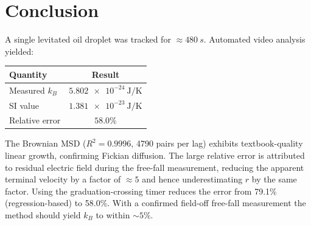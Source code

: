 \documentclass[12pt,a4paper]{article}
\begin{document}
\section{Conclusion}

A single levitated oil droplet was tracked for $\approx\SI{480}{s}$.
Automated video analysis yielded:

\begin{center}
\begin{tabular}{lc}
\toprule
Quantity & Result \\
\midrule
Measured $k_B$ & $\SI{5.802e-24}{\joule/\kelvin}$ \\
SI value       & $\SI{1.381e-23}{\joule/\kelvin}$ \\
Relative error & $58.0\%$ \\
\bottomrule
\end{tabular}
\end{center}

The Brownian MSD ($R^2=0.9996$, 4790 pairs per lag) exhibits textbook-quality
linear growth, confirming Fickian diffusion.  The large relative error is
attributed to residual electric field during the free-fall measurement,
reducing the apparent terminal velocity by a factor of $\approx5$ and hence
underestimating $r$ by the same factor.  Using the graduation-crossing
timer reduces the error from 79.1\% (regression-based) to 58.0\%.
With a confirmed field-off free-fall measurement the method should yield
$k_B$ to within $\sim5\%$.
\end{document}
